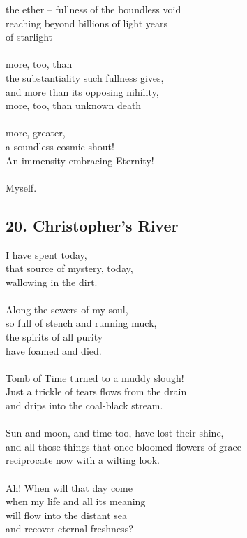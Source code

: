 \documentclass[12pt,letterpaper]{article}
\begin{document}
\begin{appendix}
\begin{subappendices}
\begin{linenumbers*}
the ether -- fullness of the boundless void \\
reaching beyond billions of light years \\
of starlight \\\\
more, too, than \\
the substantiality such fullness gives, \\
and more than its opposing nihility, \\
more, too, than unknown death \\\\
more, greater, \\
a soundless cosmic shout! \\
An immensity embracing Eternity! \\\\
Myself. \\
        \end{linenumbers*}
        \subsection{20. Christopher's River}
        \begin{linenumbers*}
I have spent today,\\
that source of mystery, today,\\
wallowing in the dirt.\\\\
Along the sewers of my soul,\\
so full of stench and running muck,\\
the spirits of all purity \\
have foamed and died. \\\\
Tomb of Time turned to a muddy slough! \\
Just a trickle of tears flows from the drain \\
and drips into the coal-black stream. \\\\
Sun and moon, and time too, have lost their shine, \\
and all those things that once bloomed flowers of grace \\
reciprocate now with a wilting look. \\\\
Ah! When will that day come \\
when my life and all its meaning \\
will flow into the distant sea \\
and recover eternal freshness? \\
        \end{linenumbers*}

\end{subappendices}
\end{appendix}
\end{document}
